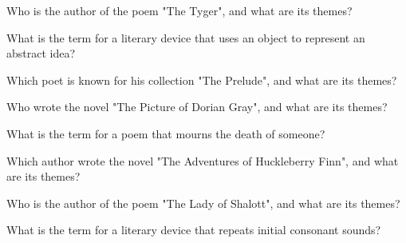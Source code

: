 \documentclass[12pt,a4paper]{book}
\begin{document}
\begin{enhancedmcq}[Question 34]{Who is the author of the poem "The Tyger", and what are its themes?}
\end{enhancedmcq}

\begin{enhancedmcq}[Question 35]{What is the term for a literary device that uses an object to represent an abstract idea?}
\end{enhancedmcq}

\begin{enhancedmcq}[Question 36]{Which poet is known for his collection "The Prelude", and what are its themes?}
\end{enhancedmcq}

\begin{enhancedmcq}[Question 37]{Who wrote the novel "The Picture of Dorian Gray", and what are its themes?}
\end{enhancedmcq}

\begin{enhancedmcq}[Question 38]{What is the term for a poem that mourns the death of someone?}
\end{enhancedmcq}

\begin{enhancedmcq}[Question 39]{Which author wrote the novel "The Adventures of Huckleberry Finn", and what are its themes?}
\end{enhancedmcq}

\begin{enhancedmcq}[Question 40]{Who is the author of the poem "The Lady of Shalott", and what are its themes?}
\end{enhancedmcq}

\begin{enhancedmcq}[Question 41]{What is the term for a literary device that repeats initial consonant sounds?}
\end{enhancedmcq}
\end{document}
